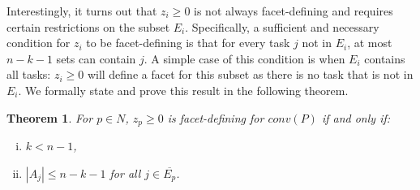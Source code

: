 \documentclass[12pt]{article}
\renewcommand{\v}[1]{\overline{#1}}
\newtheorem{thm}{Theorem}
\begin{document}
Interestingly, it turns out that $z_i \geq 0$ is not always facet-defining and requires certain restrictions on the subset $E_i$. Specifically, a sufficient and necessary condition for $z_i$ to be facet-defining is that for every task $j$ not in $E_i$, at most $n-k-1$ sets can contain $j$. A simple case of this condition is when $E_i$ contains all tasks: $z_i \geq 0$ will define a facet for this subset as there is no task that is not in $E_i$. We formally state and prove this result in the following theorem.

\begin{thm} \label{thm:zfac}
For $p \in N$, $z_p \geq 0$ is facet-defining for $conv(P)$ if and only if:
\begin{enumerate}[(i)]
	\item $k < n-1$,
	\item $|A_j| \leq n - k - 1$ for all $j \in \v{E_p}$.
\end{enumerate}
\end{thm}
\end{document}
